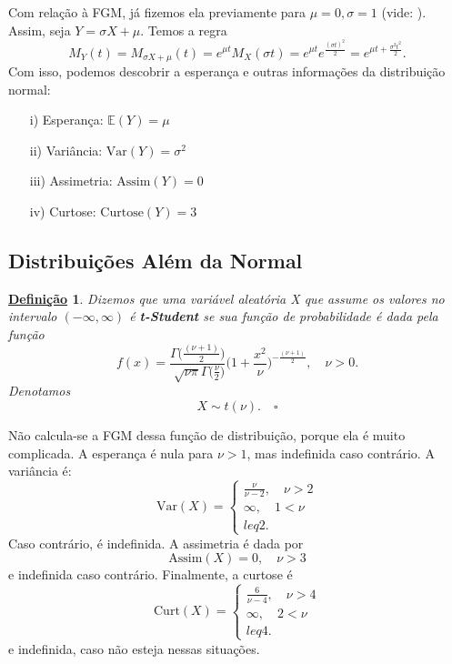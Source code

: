\documentclass{article}
\newtheorem*{def*}{\underline{Defini\c c\~ao}}
\begin{document}
  Com relação à FGM, já fizemos ela previamente para \(\mu = 0, \sigma =1\) (vide: ). Assim, seja \(Y = \sigma X + \mu.\)
Temos a regra 
  \[
    M_{Y}(t) = M_{\sigma X + \mu }(t) = e^{\mu t}M_{X}(\sigma t) = e^{\mu t}e^{\frac{(\sigma t)^{2}}{2}} = e^{\mu t + \frac{\sigma^{2}t^{2}}{2}}.
  \]
  Com isso, podemos descobrir a esperança e outras informações da distribuição normal:
 \begin{itemize}
  \item[i)] Esperança: \(\mathbb{E}(Y) = \mu \)
  \item[ii)] Variância: \(\mathrm{Var}(Y) = \sigma ^{2}\)
  \item[iii)] Assimetria: \(\mathrm{Assim}(Y) = 0\)
  \item[iv)] Curtose: \(\mathrm{Curtose}(Y) = 3\)
 \end{itemize}
 \subsection{Distribuições Além da Normal}
\begin{def*}
  Dizemos que uma variável aleatória X que assume os valores no intervalo \((-\infty, \infty)\) é \textbf{t-Student} se sua função de probabilidade é dada pela função 
  \[
    f(x) = \frac{\Gamma \biggl(\frac{(\nu+1)}{2}\biggr)}{\sqrt[]{\nu\pi }\Gamma \biggl(\frac{\nu}{2}\biggr)}\biggl(1 + \frac{x^{2}}{\nu}\biggr)^{-\frac{(\nu+1)}{2}}, \quad \nu > 0.
  \] 
  Denotamos 
  \[
    X\sim t(\nu ). \quad \square
  \]
\end{def*}
  Não calcula-se a FGM dessa função de distribuição, porque ela é muito complicada. A esperança é nula para \(\nu > 1\),
mas indefinida caso contrário. A variância é:
  \[
    \mathrm{Var}(X) = \left\{\begin{array}{ll}
        \frac{\nu}{\nu - 2},\quad \nu > 2\\
        \infty,\quad 1 < \nu \\leq 2.
      \end{array}\right.
  \]
  Caso contrário, é indefinida. A assimetria é dada por 
  \[
    \mathrm{Assim}(X) = 0,\quad \nu > 3
  \]
  e indefinida caso contrário. Finalmente, a curtose é 
  \[
    \mathrm{Curt}(X) = \left\{\begin{array}{ll}
        \frac{6}{\nu-4},\quad \nu > 4\\
        \infty,\quad 2 < \nu \\leq 4.
      \end{array}\right.
  \]
  e indefinida, caso não esteja nessas situações.
\end{document}

